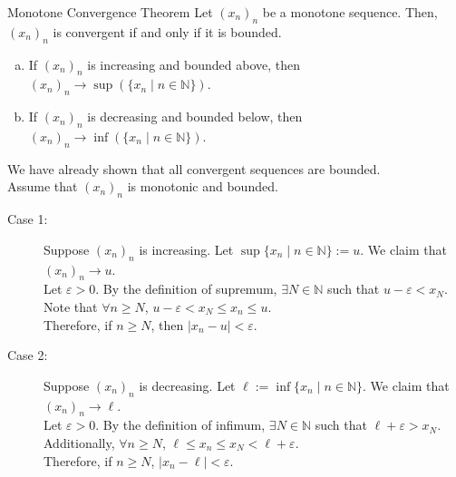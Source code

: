 \documentclass[8pt]{extarticle}
\newcommand{\N}{\mathbb{N}}
\begin{document}
  \begin{problem}{Monotone Convergence Theorem}
    Let $(x_n)_n$ be a monotone sequence. Then, $(x_n)_n$ is convergent if and only if it is bounded.
    \begin{enumerate}[(a)]
      \item If $(x_n)_n$ is increasing and bounded above, then $(x_n)_n \rightarrow \sup(\{x_n\mid n\in\N\})$.
      \item If $(x_n)_n$ is decreasing and bounded below, then $(x_n)_n \rightarrow \inf(\{x_n\mid n\in\N\})$.
    \end{enumerate}
    \tcblower
    We have already shown that all convergent sequences are bounded.\\

    Assume that $(x_n)_n$ is monotonic and bounded.
    \begin{description}
      \item[Case 1:] Suppose $(x_n)_n$ is increasing. Let $\sup\{x_n\mid n\in\N\} := u$. We claim that $(x_n)_n \rightarrow u$.\\

        Let $\varepsilon > 0$. By the definition of supremum, $\exists N\in\N$ such that $u-\varepsilon < x_{N}$. Note that $\forall n\geq N$, $u-\varepsilon < x_N \leq x_n \leq u$.\\

        Therefore, if $n\geq N$, then $|x_n - u| < \varepsilon$.
      \item[Case 2:] Suppose $(x_n)_n$ is decreasing. Let $\ell := \inf\{x_n\mid n\in\N\}$. We claim that $(x_n)_n \rightarrow \ell$.\\

        Let $\varepsilon > 0$. By the definition of infimum, $\exists N\in\N$ such that $\ell + \varepsilon > x_N$. Additionally, $\forall n \geq N$, $\ell \leq x_n \leq x_N < \ell + \varepsilon$.\\

        Therefore, if $n \geq N$, $|x_n - \ell| < \varepsilon$.
    \end{description}
  \end{problem}
\end{document}
